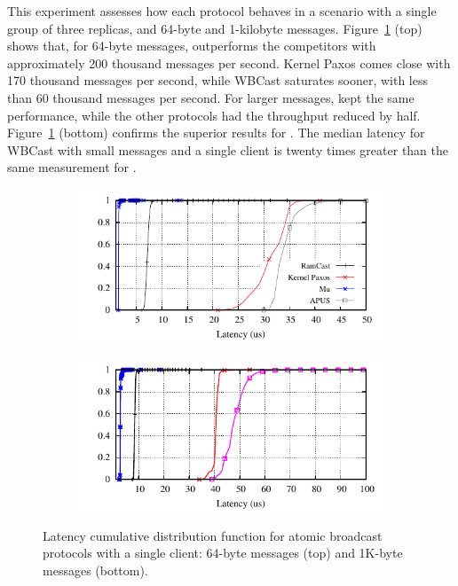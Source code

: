 This experiment assesses how each protocol behaves in a scenario with a single group of three replicas, and 64-byte and 1-kilobyte messages.
Figure~\ref{fig:broadcast} (top) shows that, for 64-byte messages, \libname outperforms the competitors with approximately 200 thousand messages per second. 
Kernel Paxos comes close with 170 thousand messages per second, while WBCast saturates sooner, with less than 60 thousand messages per second.
For larger messages, \libname kept the same performance, while the other protocols had the throughput reduced by half.
Figure~\ref{fig:broadcast} (bottom) confirms the superior results for \libname. The median latency for WBCast with small messages and a single client is twenty times greater than the same measurement for \libname.

\begin{figure}[htp!]
  \begin{subfigure}{\columnwidth}
    \advance\leftskip-0.0cm
    \includegraphics[width=1\columnwidth]{figures/benchmark/graphs/figure-compare-single-group-latency-cdf-64b}
  \end{subfigure}
  \begin{subfigure}{\columnwidth}
    \centering
    \includegraphics[width=1\columnwidth]{figures/benchmark/graphs/figure-compare-single-group-latency-cdf-1k}
  \end{subfigure}
  \caption{Latency cumulative distribution function for atomic broadcast protocols with a single client: 64-byte messages (top) and 1K-byte messages (bottom).}
  \label{fig:broadcast}
\end{figure}

